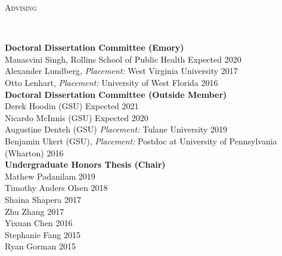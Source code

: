 \documentclass[9pt]{article}
\newenvironment{changemargin}[2]{%
  \begin{list}{}{%
    \setlength{\topsep}{0pt}%
    \setlength{\leftmargin}{#1}%
    \setlength{\rightmargin}{#2}%
    \setlength{\listparindent}{\parindent}%
    \setlength{\itemindent}{\parindent}%
    \setlength{\parsep}{\parskip}%
  }%
  \item[]}{\end{list}
}
\newcommand{\lineover}{
	\begin{changemargin}{-0.05in}{-0.05in}
		\vspace*{-8pt}
		\hrulefill \\
		\vspace*{-2pt}
	\end{changemargin}
}
\newcommand{\header}[1]{
	\begin{changemargin}{-0.5in}{-0.5in}
		\scshape{#1}\\
  	\lineover
	\end{changemargin}
}
\newenvironment{body} {
	\vspace*{-16pt}
	\begin{changemargin}{-0.25in}{-0.5in}
  }	
	{\end{changemargin}
}
\begin{document}
\header{Advising}
\begin{body}
  \vspace{14pt}
  \textbf{Doctoral Dissertation Committee (Emory)} \\
    Manasvini Singh, Rollins School of Public Health \hfill Expected 2020 \\
    Alexander Lundberg, \textit{Placement:} West Virginia University \hfill 2017 \\
    Otto Lenhart, \textit{Placement:} University of West Florida \hfill 2016 \\

  \medskip
  \textbf{Doctoral Dissertation Committee (Outside Member)} \\
    Derek Hoodin (GSU) \hfill Expected 2021 \\
    Nicardo McInnis (GSU) \hfill Expected 2020 \\
    Augustine Denteh (GSU) \textit{Placement:} Tulane University \hfill 2019 \\
    Benjamin Ukert (GSU), \textit{Placement:} Postdoc at University of Pennsylvania (Wharton) \hfill 2016 \\

  \medskip
  \textbf{Undergraduate Honors Thesis (Chair)} \\
    Mathew Padanilam \hfill 2019 \\
    Timothy Anders Olsen \hfill 2018 \\
    Shaina Shapera \hfill 2017 \\
    Zhu Zhang \hfill 2017 \\
    Yixuan Chen \hfill 2016 \\
    Stephanie Fang \hfill 2015 \\
    Ryan Gorman \hfill 2015 \\
\end{body}
\smallskip
\end{document}
